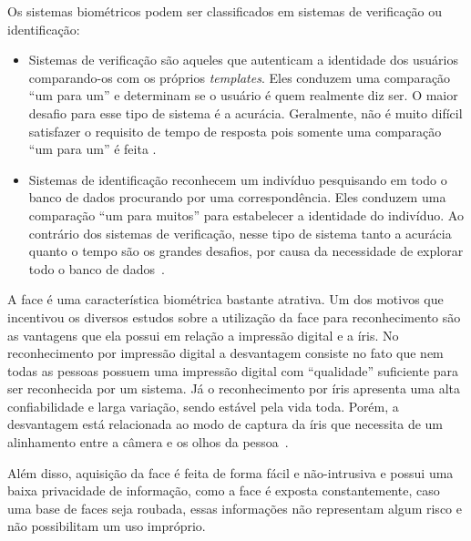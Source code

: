 	Os sistemas biométricos podem ser classificados em sistemas de verificação ou
	identificação:
	
	\begin{itemize}
		\item Sistemas de verificação são aqueles que autenticam a identidade
		dos usuários comparando-os com os próprios \textit{templates}. Eles conduzem uma
		comparação ``um para um'' e determinam se o usuário é quem realmente diz ser. O
		maior desafio para esse tipo de sistema é a acurácia. Geralmente, não é muito
		difícil satisfazer o requisito de tempo de resposta pois somente uma comparação
		``um para um'' é feita \cite{hong}.
	
		\item Sistemas de identificação reconhecem um indivíduo pesquisando em todo o
		banco de dados procurando por uma correspondência. Eles conduzem uma comparação ``um para
		muitos'' para estabelecer a identidade do indivíduo. Ao contrário dos sistemas
		de verificação, nesse tipo de sistema tanto a acurácia quanto o tempo são os
		grandes desafios, por causa da necessidade de explorar todo o banco de dados~\cite{hong}.
	\end{itemize}
	
	A face é uma característica biométrica bastante atrativa. Um dos motivos que
	incentivou os diversos estudos sobre a utilização da face para reconhecimento
	são as vantagens que ela possui em relação a impressão digital e a íris.  No
	reconhecimento por impressão digital a desvantagem consiste no fato que nem
	todas as pessoas possuem uma impressão digital com ``qualidade'' suficiente para
	ser reconhecida por um sistema. Já o reconhecimento por íris apresenta uma alta
	confiabilidade e larga variação, sendo estável pela vida toda. Porém, a
	desvantagem está relacionada ao modo de captura da íris que necessita de um
	alinhamento entre a câmera e os olhos da pessoa~\cite{saocarlos}.
	
	Além disso, aquisição da face é feita de forma fácil e não-intrusiva e possui
	uma baixa privacidade de informação, como a face é exposta constantemente, caso
	uma base de faces seja roubada, essas informações não representam algum risco e
	não possibilitam um uso impróprio.